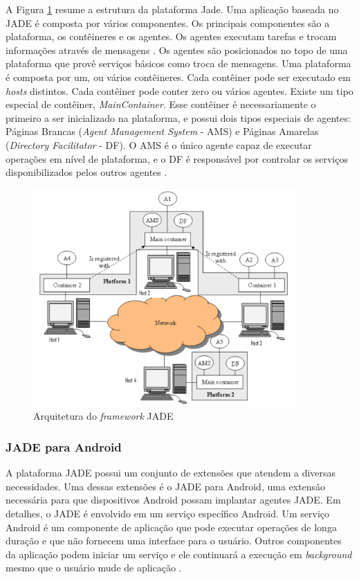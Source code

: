 A Figura \ref{figura:jade} resume a estrutura da plataforma Jade. Uma aplicação
baseada no JADE é composta por vários componentes. Os principais componentes são
a plataforma, os contêineres e os agentes. Os agentes executam tarefas e trocam
informações através de mensagens \cite{fabio2007}. Os agentes são posicionados
no topo de uma plataforma que provê serviços básicos como troca de mensagens.
Uma plataforma é composta por um, ou vários contêineres. Cada contêiner pode ser
executado em \textit{hosts} distintos. Cada contêiner pode conter zero ou vários
agentes. Existe um tipo especial de contêiner, \textit{MainContainer}. Esse
contêiner é necessariamente o primeiro a ser inicializado na plataforma, e
possui dois tipos especiais de agentes: Páginas Brancas (\textit{Agent
Management System} - AMS) e Páginas Amarelas (\textit{Directory Facilitator} -
DF). O AMS é o único agente capaz de executar operações em nível de plataforma,
e o DF é responsável por controlar os serviços disponibilizados pelos outros
agentes \cite{jade}.

\begin{figure}[h]
  \centering
  \includegraphics[width=10cm]{figuras/jade_architecture.png}
  \caption{Arquitetura do \textit{framework} JADE \cite{jadeArchitechture}}
  \label{figura:jade}
\end{figure}

\subsubsection{JADE para Android}

A plataforma JADE possui um conjunto de extensões que atendem a diversas necessidades. Uma dessas extensões é o JADE para Android, uma extensão necessária para que dispositivos Android possam implantar agentes JADE. Em detalhes, o JADE é envolvido em um serviço específico Android. Um serviço Android é um componente de aplicação que pode executar operações de longa duração e que não fornecem uma interface para o usuário. Outros componentes da aplicação podem iniciar um serviço e ele continuará a execução em \textit{background} mesmo que o usuário mude de aplicação \cite{bergenti2014}.

